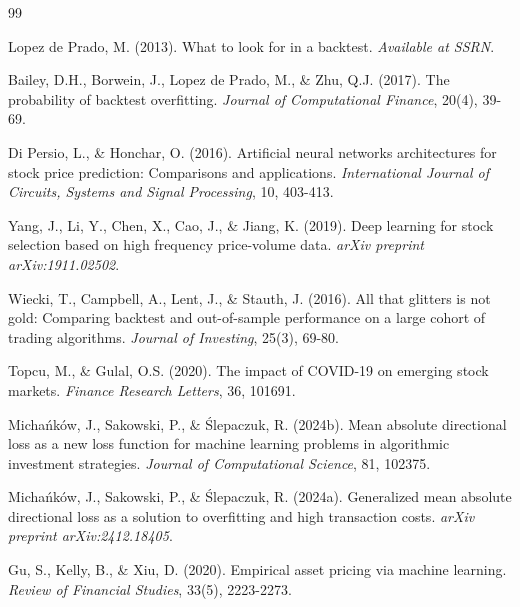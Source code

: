 \documentclass[openany]{book}
\numberwithin{figure}{chapter}
\numberwithin{equation}{chapter}
\begin{document}
\begin{thebibliography}{99}

Lopez de Prado, M. (2013). What to look for in a backtest. \textit{Available at SSRN}.

Bailey, D.H., Borwein, J., Lopez de Prado, M., \& Zhu, Q.J. (2017). The probability of backtest overfitting. \textit{Journal of Computational Finance}, 20(4), 39-69.

Di Persio, L., \& Honchar, O. (2016). Artificial neural networks architectures for stock price prediction: Comparisons and applications. \textit{International Journal of Circuits, Systems and Signal Processing}, 10, 403-413.

Yang, J., Li, Y., Chen, X., Cao, J., \& Jiang, K. (2019). Deep learning for stock selection based on high frequency price-volume data. \textit{arXiv preprint arXiv:1911.02502}.

Wiecki, T., Campbell, A., Lent, J., \& Stauth, J. (2016). All that glitters is not gold: Comparing backtest and out-of-sample performance on a large cohort of trading algorithms. \textit{Journal of Investing}, 25(3), 69-80.

Topcu, M., \& Gulal, O.S. (2020). The impact of COVID-19 on emerging stock markets. \textit{Finance Research Letters}, 36, 101691.

Michańków, J., Sakowski, P., \& Ślepaczuk, R. (2024b). Mean absolute directional loss as a new loss function for machine learning problems in algorithmic investment strategies. \textit{Journal of Computational Science}, 81, 102375.

Michańków, J., Sakowski, P., \& Ślepaczuk, R. (2024a). Generalized mean absolute directional loss as a solution to overfitting and high transaction costs. \textit{arXiv preprint arXiv:2412.18405}.

Gu, S., Kelly, B., \& Xiu, D. (2020). Empirical asset pricing via machine learning. \textit{Review of Financial Studies}, 33(5), 2223-2273.

\end{thebibliography}
\end{document}
